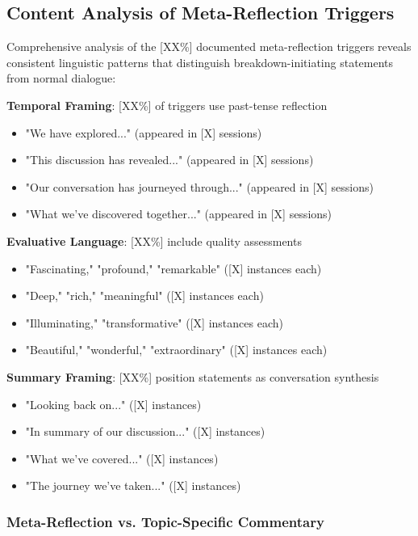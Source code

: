 \documentclass[11pt,letterpaper]{article}
\newcommand{\metaReflectionTriggers}{[XX\%]} %
\begin{document}
\subsection{Content Analysis of Meta-Reflection Triggers}

Comprehensive analysis of the \metaReflectionTriggers{} documented meta-reflection triggers reveals consistent linguistic patterns that distinguish breakdown-initiating statements from normal dialogue:

\textbf{Temporal Framing}: [XX\%] of triggers use past-tense reflection
\begin{itemize}
    \item "We have explored..." (appeared in [X] sessions)
    \item "This discussion has revealed..." (appeared in [X] sessions)  
    \item "Our conversation has journeyed through..." (appeared in [X] sessions)
    \item "What we've discovered together..." (appeared in [X] sessions)
\end{itemize}

\textbf{Evaluative Language}: [XX\%] include quality assessments
\begin{itemize}
    \item "Fascinating," "profound," "remarkable" ([X] instances each)
    \item "Deep," "rich," "meaningful" ([X] instances each)
    \item "Illuminating," "transformative" ([X] instances each)
    \item "Beautiful," "wonderful," "extraordinary" ([X] instances each)
\end{itemize}

\textbf{Summary Framing}: [XX\%] position statements as conversation synthesis
\begin{itemize}
    \item "Looking back on..." ([X] instances)
    \item "In summary of our discussion..." ([X] instances)
    \item "What we've covered..." ([X] instances)
    \item "The journey we've taken..." ([X] instances)
\end{itemize}

\subsubsection{Meta-Reflection vs. Topic-Specific Commentary}
\end{document}
